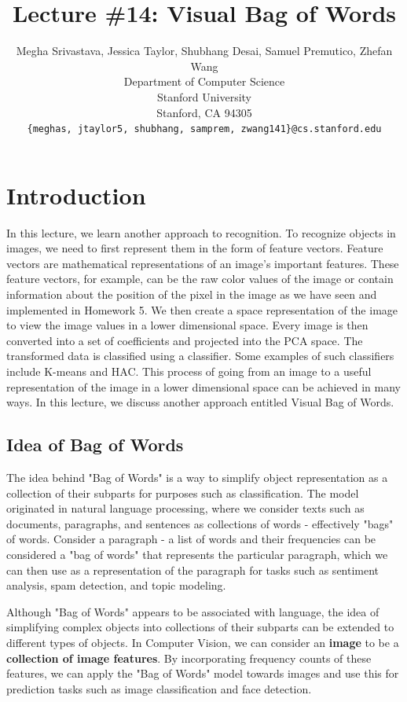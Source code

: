\documentclass{article}
\title{Lecture \#14: Visual Bag of Words}
\author{
  Megha Srivastava, Jessica Taylor, Shubhang Desai, Samuel Premutico,  Zhefan Wang \\
  Department of Computer Science\\
  Stanford University\\
  Stanford, CA 94305 \\
  \texttt{\{meghas, jtaylor5, shubhang, samprem, zwang141\}@cs.stanford.edu} \\
}
\begin{document}
\maketitle


\section{Introduction}	
In this lecture, we learn another approach to recognition. To recognize objects in images, we need to first represent them in the form of feature vectors. Feature vectors are mathematical representations of an image's important features.  These feature vectors, for example, can be the raw color values of the image or contain information about the position of the pixel in the image as we have seen and implemented in Homework 5. We then create a space representation of the image to view the image values in a lower dimensional space.  Every image is then converted into a set of coefficients and projected into the PCA space.  The transformed data is classified using a classifier. Some examples of such classifiers include K-means and HAC.  This process of going from an image to a useful representation of the image in a lower dimensional space can be achieved in many ways.  In this lecture, we discuss another approach entitled Visual Bag of Words.

\subsection{Idea of Bag of Words}
The idea behind "Bag of Words" is a way to simplify object representation as a collection of their subparts for purposes such as classification. The model originated in natural language processing, where we consider texts such as documents, paragraphs, and sentences as collections of words - effectively "bags" of words. Consider a paragraph - a list of words and their frequencies can be considered a "bag of words" that represents the particular paragraph, which we can then use as a representation of the paragraph for tasks such as sentiment analysis, spam detection, and topic modeling. 

Although "Bag of Words" appears to be associated with language, the idea of simplifying complex objects into collections of their subparts can be extended to different types of objects. In Computer Vision, we can consider an \textbf{image} to be a \textbf{collection of image features}. By incorporating frequency counts of these features, we can apply the "Bag of Words" model towards images and use this for prediction tasks such as image classification and face detection.
\end{document}
